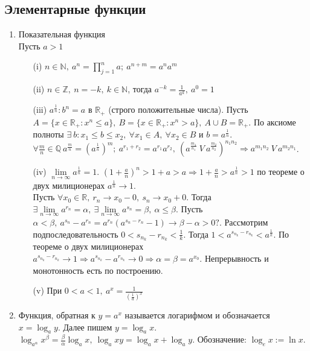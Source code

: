 \documentclass[a4paper, 12pt]{article}
\newcommand{\Z}{\mathbb{Z}}
\newcommand{\N}{\mathbb{N}}
\newcommand{\R}{\mathbb{R}}
\newcommand{\Q}{\mathbb{Q}}
\theoremstyle{definition}
\begin{document}
        \subsection{Элементарные функции}
        \begin{enumerate}
            \item Показательная функция\\
            Пусть $a>1$
            \begin{itemize}
                \item[(i)] $n\in \N,\ a^n=\prod\limits_{j=1}^n a;\ a^{n+m}=a^n a^m$
                \item[(ii)] $n\in \Z,\ n=-k,\ k\in \N$, тогда $a^{-k}=\frac{1}{a^k},\ a^0=1$
                \item[(iii)] $a^\frac{1}{n}: b^n=a$ в $\R_{+}$ (строго положительные числа). Пусть $A=\{x\in \R_{+}: x^n\leq a\},\ B=\{x\in \R_{+}: x^n>a\},\ A\cup B=\R_{+}$. По аксиоме полноты $\exists\ b: x_1\leq b\leq x_2,\ \forall x_1\in A,\ \forall x_2\in B$ и $b=a^{\frac{1}{n}}$. $\forall \frac{m}{n}\in \Q\ a^{\frac{m}{n}}=(a^{\frac{1}{n}})^m;\ a^{r_1+r_2}=a^{r_1}a^{r_2},\ (a^{\frac{m_1}{n_1}}\ V\ a^{\frac{m_2}{n_2}})^{n_1 n_2}\Rightarrow a^{m_1 n_2}\ V\ a^{m_2 n_1}$.
                \item[(iv)] $\lim\limits_{n\to \infty} a^{\frac{1}{n}}=1$. $(1+\frac{a}{n})^n>1+a>a \Rightarrow 1+\frac{a}{n}>a^{\frac{1}{n}}>1$ по теореме о двух милиционерах $a^{\frac{1}{n}}\to 1$.\\
                Пусть $\forall x_0\in \R,\ r_n\to x_0-0,\ s_n\to x_0+0$. Тогда $\exists \lim\limits_{n\to\infty}a^{r_n}=\alpha,\ \exists \lim\limits_{n\to \infty}a^{s_n}=\beta,\ \alpha\leq \beta$. Пусть $\alpha < \beta,\ a^{s_n}-a^{r_n}=a^{r_n}(a^{s_n-r_n}-1)\to \beta-\alpha>0?$. Рассмотрим подпоследовательность $0<s_{n_k}-r_{n_k}<\frac{1}{k}$. Тогда $1<a^{s_{n_k}-r_{n_k}}<a^{\frac{1}{k}}$. По теореме о двух милиционерах $a^{s_{n_k}-r_{n_k}}\to 1 \Rightarrow a^{s_{n_k}}-a^{r_{n_k}}\to 0 \Rightarrow \alpha=\beta=a^{x_0}$. Непрерывность и монотонность есть по построению.
                \item[(v)] При $0<a<1,\ a^x=\frac{1}{(\frac{1}{a})^x}$
            \end{itemize}
            \item Функция, обратная к $y=a^x$ называется логарифмом и обозначается $x=\log_a{y}$. Далее пишем $y=\log_a{x}$.\\
            $\log_{a^{\alpha}}{x^{\beta}}=\frac{\beta}{\alpha}\log_a{x},\ \log_a{xy}=\log_a{x}+\log_a{y}$. Обозначение: $\log_e{x}:=\ln{x}$.

\end{enumerate}
\end{document}
